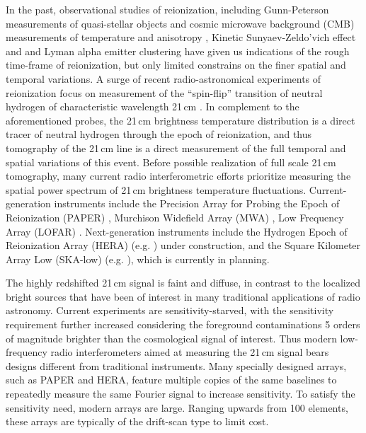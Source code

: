 \documentclass[twocolumn,apj,numberedappendix]{emulateapj}
\renewcommand\[{\begin{equation}}
\renewcommand\]{\end{equation}}
\begin{document}
In the past, observational studies of reionization, including Gunn-Peterson measurements of quasi-stellar objects \citep{Fan2006} and cosmic microwave background (CMB) measurements of temperature and anisotropy \citep{Planck2016}, Kinetic Sunyaev-Zeldo'vich effect \citep{kszpatchy} and and Lyman alpha emitter clustering \citep{mcquinnLyA} have given us indications of the rough time-frame of reionization, but only limited constrains on the finer spatial and temporal variations. A surge of recent radio-astronomical experiments of reionization focus on measurement of the ``spin-flip'' transition of neutral
hydrogen of characteristic wavelength 21\,cm \citep{Furlanetto2006181,PritchardLoeb}.
In complement to the aforementioned probes, the 21\,cm brightness temperature distribution is a direct tracer of neutral hydrogen through the epoch of reionization, and thus tomography of the 21\,cm line is a direct measurement of the full temporal and spatial variations of this event. 
Before possible realization of full scale 21\,cm tomography, many current radio interferometric efforts
prioritize measuring the spatial power spectrum of 21\,cm brightness temperature fluctuations.
Current-generation instruments include the Precision Array for Probing
the Epoch of Reionization (PAPER) \citep{Ali2015,paper32}, Murchison
Widefield Array (MWA) \citep{Bowman2013, Tingay2013}, Low Frequency Array (LOFAR) \citep{LOFAR}. Next-generation instruments include the Hydrogen Epoch of Reionization
Array (HERA) (e.g. \citealt{HERA,HERAconfiguration,HERABEAM1,HERADISH2})  under construction, 
and the Square Kilometer Array Low (SKA-low) (e.g. \citealt{SKA1}), which is currently in planning. 

The highly redshifted 21\,cm signal is faint and diffuse, in contrast to the localized bright sources that have been of interest in many traditional applications of radio astronomy.  Current experiments are sensitivity-starved, with the sensitivity requirement further increased considering the foreground contaminations 5 orders of magnitude brighter than the cosmological signal of interest. Thus modern low-frequency radio interferometers aimed at measuring the 21\,cm signal bears designs different from traditional instruments. Many specially designed arrays, such as PAPER and HERA, feature multiple copies of the same baselines to repeatedly measure the same Fourier signal to increase sensitivity. To satisfy the sensitivity need, modern arrays are large. Ranging upwards from 100 elements, these arrays are typically of the drift-scan type to limit cost.
\end{document}
